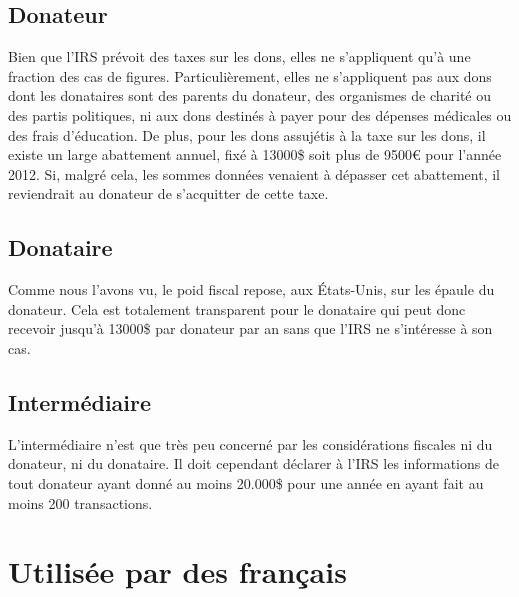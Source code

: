         \subsection{Donateur}
            Bien que l'IRS prévoit des taxes sur les dons, elles ne
            s'appliquent qu'à une fraction des cas de figures.
            Particulièrement, elles ne s'appliquent pas aux dons dont les
            donataires sont des parents du donateur, des organismes de
            charité ou des partis politiques, ni aux dons destinés à payer
            pour des dépenses médicales ou des frais d'éducation.
            De plus, pour les dons assujétis à la taxe sur les dons, il
            existe un large abattement annuel, fixé à 13000\$ soit plus
            de 9500\euro{} pour l'année 2012. Si, malgré cela, les sommes
            données venaient à dépasser cet abattement, il reviendrait au
            donateur de s'acquitter de cette taxe.
        \subsection{Donataire}
            Comme nous l'avons vu, le poid fiscal repose, aux États-Unis,
            sur les épaule du donateur. Cela est totalement transparent
            pour le donataire qui peut donc recevoir jusqu'à 13000\$
            par donateur par an sans que l'IRS ne s'intéresse à son cas.
        \subsection{Intermédiaire}
            L'intermédiaire n'est que très peu concerné par les
            considérations fiscales ni du donateur, ni du donataire.
            Il doit cependant déclarer à l'IRS les informations de
            tout donateur ayant donné au moins 20.000\$ pour une année en
            ayant fait au moins 200 transactions.
    \section{Utilisée par des français}
